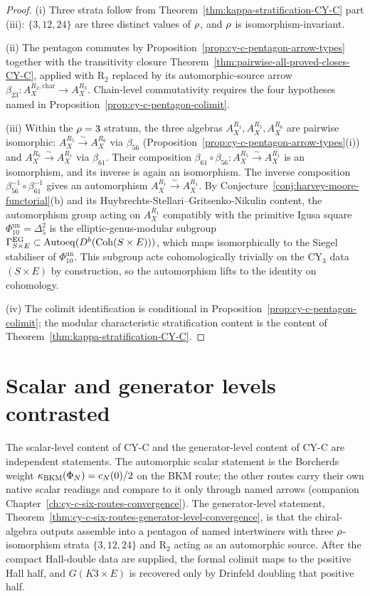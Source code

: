 \begin{proof}
(i) Three strata follow from Theorem~\ref{thm:kappa-stratification-CY-C} part (iii): $\{3, 12, 24\}$ are
three distinct values of $\rho$, and $\rho$ is isomorphism-invariant.

(ii) The pentagon commutes by Proposition~\ref{prop:cy-c-pentagon-arrow-types} together with the transitivity
closure Theorem~\ref{thm:pairwise-all-proved-closes-CY-C}, applied with R$_2$ replaced by its automorphic-source
arrow $\beta_{23}: A_X^{R_2, \mathrm{char}} \to A_X^{R_3}$. Chain-level commutativity requires
the four hypotheses named in Proposition~\ref{prop:cy-c-pentagon-colimit}.

(iii) Within the $\rho = 3$ stratum, the three algebras $A_X^{R_1}, A_X^{R_5}, A_X^{R_6}$ are pairwise
isomorphic: $A_X^{R_5} \xrightarrow{\sim} A_X^{R_6}$ via $\beta_{56}$ (Proposition~\ref{prop:cy-c-pentagon-arrow-types}(i))
and $A_X^{R_6} \xrightarrow{\sim} A_X^{R_1}$ via $\beta_{61}$. Their composition
$\beta_{61} \circ \beta_{56}: A_X^{R_5} \xrightarrow{\sim} A_X^{R_1}$ is an isomorphism, and its inverse
is again an isomorphism. The inverse composition $\beta_{56}^{-1} \circ \beta_{61}^{-1}$ gives an
automorphism $A_X^{R_1} \xrightarrow{\sim} A_X^{R_1}$. By Conjecture~\ref{conj:harvey-moore-functorial}(b)
and its Huybrechts-Stellari--Gritsenko-Nikulin content, the automorphism group acting on $A_X^{R_1}$
compatibly with the primitive Igusa square $\Phi_{10}^{\mathrm{un}}=\Delta_5^2$ is the elliptic-genus-modular subgroup $\Gamma^{\mathrm{EG}}_{S \times E} \subset
\mathrm{Autoeq}(D^b(\mathrm{Coh}(S \times E)))$, which maps isomorphically to the Siegel stabiliser of $\Phi_{10}^{\mathrm{un}}$.
This subgroup acts cohomologically trivially on the CY$_3$ data $(S \times E)$ by construction, so the
automorphism lifts to the identity on cohomology.

(iv) The colimit identification is conditional in Proposition~\ref{prop:cy-c-pentagon-colimit}; the modular
characteristic stratification content is the content of Theorem~\ref{thm:kappa-stratification-CY-C}.
\end{proof}

\section{Scalar and generator levels contrasted}
\label{sec:cy-c-gl-scalar-vs-generator}

The scalar-level content of CY-C and the generator-level content of CY-C are independent statements. The
automorphic scalar statement is the Borcherds weight $\kappa_{\mathrm{BKM}}(\Phi_N) = c_N(0)/2$ on the BKM route; the other
routes carry their own native scalar readings and compare to it only through named arrows (companion
Chapter~\ref{ch:cy-c-six-routes-convergence}). The
generator-level statement, Theorem~\ref{thm:cy-c-six-routes-generator-level-convergence}, is that the
chiral-algebra outputs assemble into a pentagon of named intertwiners with three $\rho$-isomorphism
strata $\{3, 12, 24\}$ and R$_2$ acting as an automorphic source. After the compact Hall-double data are
supplied, the formal colimit maps to the positive Hall half, and \(G(K3 \times E)\) is recovered only by
Drinfeld doubling that positive half.

